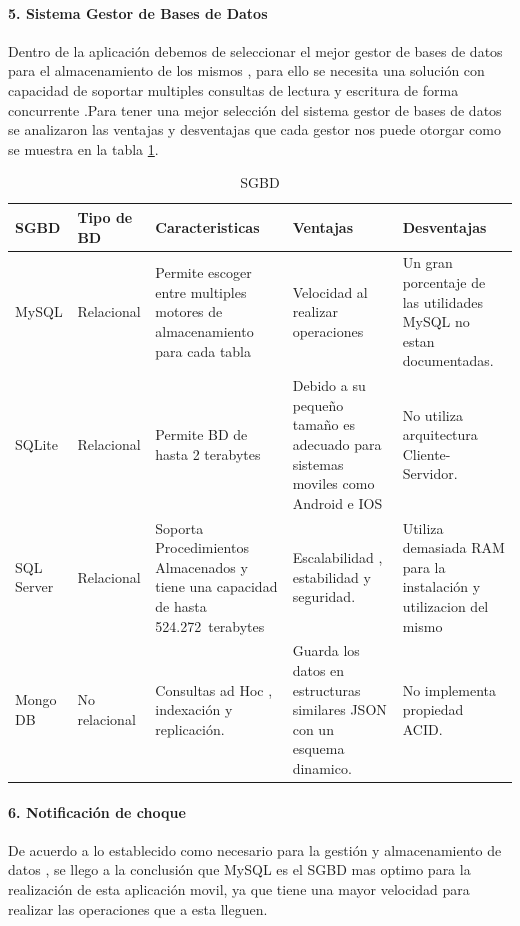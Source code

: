 \paragraph{5. Sistema Gestor de Bases de Datos} 
Dentro de la aplicación debemos de seleccionar el mejor gestor de bases de datos para el almacenamiento de los mismos , para ello se necesita una solución con capacidad de soportar multiples consultas de lectura y escritura de forma concurrente .Para tener una mejor selección del sistema gestor de bases de datos se analizaron las ventajas y desventajas que cada gestor nos puede otorgar como se muestra en la tabla \ref{disenoEstructura:SGBD}.
\begin{table}[h!]
\begin{tabular}{|p{3cm}|p{3.5cm}|p{3cm}|p{3cm}|p{3cm}|}
\hline
\textbf{SGBD}&\textbf{Tipo de BD}& \textbf{Caracteristicas}& \textbf{Ventajas} & \textbf{Desventajas} \\
\hline
\hline
MySQL & Relacional & Permite escoger entre multiples motores de almacenamiento para cada tabla & Velocidad al realizar operaciones & Un gran porcentaje de las utilidades MySQL no estan documentadas. \\
\hline
\hline
SQLite & Relacional & Permite BD de hasta 2 terabytes & Debido a su pequeño tamaño es adecuado para sistemas moviles como Android e IOS & No utiliza arquitectura Cliente-Servidor. \\
\hline
\hline
SQL Server & Relacional & Soporta Procedimientos Almacenados y tiene una capacidad de hasta 524.272 terabytes & Escalabilidad , estabilidad y seguridad. & Utiliza demasiada RAM para la instalación y utilizacion del mismo \\
\hline
\hline
Mongo DB & No relacional & Consultas ad Hoc , indexación y replicación. &Guarda los datos en estructuras similares JSON con un esquema dinamico.& No implementa propiedad ACID. \\
\hline

\end{tabular}
\caption{SGBD}
\label{disenoEstructura:SGBD}
\end{table}

\paragraph{6. Notificación de choque} 

De acuerdo a lo establecido como necesario para la gestión y almacenamiento de datos , se llego a la conclusión que MySQL es el SGBD mas optimo para la realización de esta aplicación movil, ya que tiene una mayor velocidad para realizar las operaciones que a esta lleguen. 

